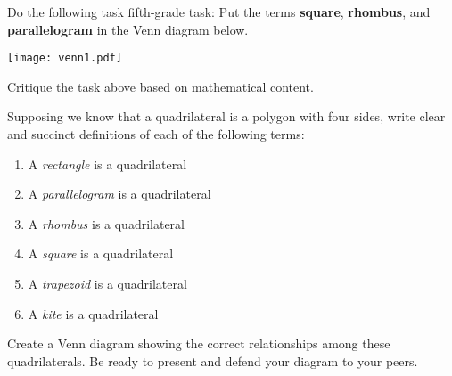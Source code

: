 \documentclass[nooutcomes]{ximera}
\begin{document}
\begin{problem}
Do the following task fifth-grade task: Put the
terms \textbf{square}, \textbf{rhombus}, and \textbf{parallelogram} in
the Venn diagram below.  
\begin{image}
\texttt{[image: venn1.pdf]}
\end{image}
\end{problem}

\begin{problem} 
Critique the task above based on mathematical content.
\vfill
\end{problem}

\newpage 
\begin{problem}
Supposing we know that a quadrilateral is a polygon with four sides, write clear and succinct definitions of each of the following terms: 
\begin{enumerate}
\itemsep18pt
\item A \textit{rectangle} is a quadrilateral 
\item A \textit{parallelogram} is a quadrilateral
\item A \textit{rhombus} is a quadrilateral
\item A \textit{square} is a quadrilateral
\item A \textit{trapezoid} is a quadrilateral
\item A \textit{kite} is a quadrilateral
\end{enumerate}
\end{problem}
\bigskip

\begin{problem} 
Create a Venn diagram showing the correct relationships
among these quadrilaterals. Be ready to present and defend your
diagram to your peers.
\vfill
\end{problem}
\end{document}

